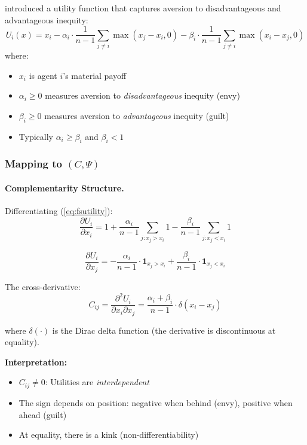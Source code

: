 \citet{fehrschmidt} introduced a utility function that captures
aversion to disadvantageous and advantageous inequity:
\begin{equation}
  U_i(x) = x_i - \alpha_i \cdot \frac{1}{n-1} \sum_{j \neq i} \max(x_j - x_i, 0)
         - \beta_i \cdot \frac{1}{n-1} \sum_{j \neq i} \max(x_i - x_j, 0)
  \label{eq:fsutility}
\end{equation}
where:
\begin{itemize}
  \item $x_i$ is agent $i$'s material payoff
  \item $\alpha_i \geq 0$ measures aversion to \emph{disadvantageous} inequity (envy)
  \item $\beta_i \geq 0$ measures aversion to \emph{advantageous} inequity (guilt)
  \item Typically $\alpha_i \geq \beta_i$ and $\beta_i < 1$
\end{itemize}

\subsubsection{Mapping to $(C, \Psi)$}

\paragraph{Complementarity Structure.}
Differentiating (\ref{eq:fsutility}):
\begin{equation}
  \frac{\partial U_i}{\partial x_i} = 1 + \frac{\alpha_i}{n-1} \sum_{j: x_j > x_i} 1
                                    - \frac{\beta_i}{n-1} \sum_{j: x_j < x_i} 1
\end{equation}

\begin{equation}
  \frac{\partial U_i}{\partial x_j} = -\frac{\alpha_i}{n-1} \cdot \mathbf{1}_{x_j > x_i}
                                    + \frac{\beta_i}{n-1} \cdot \mathbf{1}_{x_j < x_i}
\end{equation}

The cross-derivative:
\begin{equation}
  C_{ij} = \frac{\partial^2 U_i}{\partial x_i \partial x_j} 
         = \frac{\alpha_i + \beta_i}{n-1} \cdot \delta(x_i - x_j)
  \label{eq:fscomplementarity}
\end{equation}

where $\delta(\cdot)$ is the Dirac delta function (the derivative is discontinuous at equality).

\textbf{Interpretation:}
\begin{itemize}
  \item $C_{ij} \neq 0$: Utilities are \emph{interdependent}
  \item The sign depends on position: negative when behind (envy), positive when ahead (guilt)
  \item At equality, there is a kink (non-differentiability)
\end{itemize}

